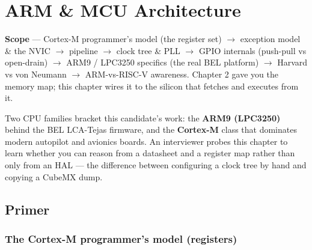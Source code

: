 
\chapter{ARM \& MCU Architecture}
\label{ch:arm-architecture}

\begin{partnote}
\textbf{Scope} --- Cortex-M programmer's model (the register set)
$\rightarrow$ exception model \& the NVIC $\rightarrow$ pipeline $\rightarrow$
clock tree \& PLL $\rightarrow$ GPIO internals (push-pull vs open-drain)
$\rightarrow$ ARM9 / LPC3250 specifics (the real BEL platform) $\rightarrow$
Harvard vs von Neumann $\rightarrow$ ARM-vs-RISC-V awareness. Chapter 2 gave
you the memory map; this chapter wires it to the silicon that fetches and
executes from it.
\end{partnote}

Two CPU families bracket this candidate's work: the \textbf{ARM9 (LPC3250)}
behind the BEL LCA-Tejas firmware, and the \textbf{Cortex-M} class that
dominates modern autopilot and avionics boards. An interviewer probes this
chapter to learn whether you can reason from a datasheet and a register map
rather than only from an HAL --- the difference between configuring a clock
tree by hand and copying a CubeMX dump.

\section{Primer}

\subsection{The Cortex-M programmer's model (registers)}

